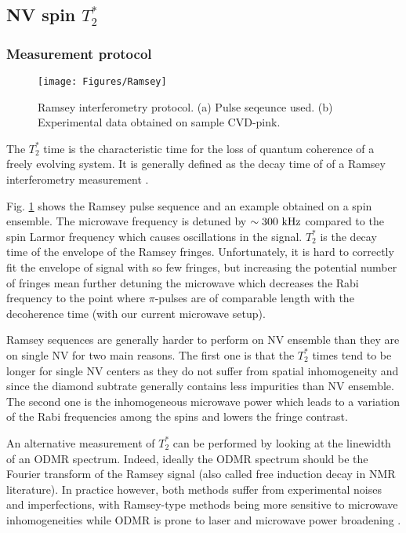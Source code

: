 \documentclass[a4paper,11pt]{report}
\begin{document}
\subsection{NV spin $T_2^*$}
\subsubsection{Measurement protocol}
\begin{figure}[h!]
\centering
\texttt{[image: Figures/Ramsey]}
\caption{Ramsey interferometry protocol. (a) Pulse seqeunce used. (b) Experimental data obtained on sample CVD-pink.} %
\label{Ramsey}
\end{figure}

The $T_2^*$ time is the characteristic time for the loss of quantum coherence of a freely evolving system. It is generally defined as the decay time of of a Ramsey interferometry measurement \citep{barry2020sensitivity}.

Fig. \ref{Ramsey} shows the Ramsey pulse sequence and an  example obtained on a spin ensemble. The microwave frequency is detuned by $\sim 300\ \rm kHz$ compared to the spin Larmor frequency which causes oscillations in the signal. $T_2^*$ is the decay time of the envelope of the Ramsey fringes. Unfortunately, it is hard to correctly fit the envelope of signal with so few fringes, but increasing the potential number of fringes mean further detuning the microwave which decreases the Rabi frequency to the point where $\pi$-pulses are of comparable length with the decoherence time (with our current microwave setup).

Ramsey sequences are generally harder to perform on NV ensemble than they are on single NV for two main reasons. The first one is that the $T_2^*$ times tend to be longer for single NV centers as they do not suffer from spatial inhomogeneity and since the diamond subtrate generally contains less impurities than NV ensemble. The second one is the inhomogeneous microwave power which leads to a variation of the Rabi frequencies among the spins \citep{barry2016optical, zhou2020quantum} and lowers the fringe contrast.

An alternative measurement of $T_2^*$ can be performed by looking at the linewidth of an ODMR spectrum. Indeed, ideally the ODMR spectrum should be the Fourier transform of the Ramsey signal (also called free induction decay in NMR literature). In practice however, both methods suffer from experimental noises and imperfections, with Ramsey-type methods being more sensitive to microwave inhomogeneities \citep{barry2020sensitivity} while ODMR is prone to laser and microwave power broadening \citep{dreau2011avoiding}. 
\end{document}
